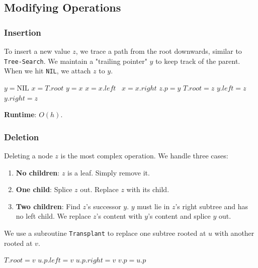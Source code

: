 \documentclass[12pt]{article}
\theoremstyle{blueplain}
\theoremstyle{bluedef}
\theoremstyle{blueremark}
\begin{document}
\subsection{Modifying Operations}

\subsubsection{Insertion}
To insert a new value $z$, we trace a path from the root downwards, similar to \texttt{Tree-Search}. We maintain a "trailing pointer" $y$ to keep track of the parent. When we hit \texttt{NIL}, we attach $z$ to $y$.

\begin{algorithm}
    \caption{Tree Insert}\label{alg:treeInsert}
    \begin{algorithmic}[1]
        \State $y = \text{NIL}$
        \State $x = T.root$
        \State $y = x$
         $x = x.left$
        \Else \ $x = x.right$
        \EndIf
        \EndWhile
        \State $z.p = y$
         $T.root = z$ 
         $y.left = z$
        \Else \ $y.right = z$
        \EndIf
        \EndProcedure
    \end{algorithmic}
\end{algorithm}
\textbf{Runtime}: $O(h)$.

\subsubsection{Deletion}
Deleting a node $z$ is the most complex operation. We handle three cases:
\begin{enumerate}
    \item \textbf{No children}: $z$ is a leaf. Simply remove it.
    \item \textbf{One child}: Splice $z$ out. Replace $z$ with its child.
    \item \textbf{Two children}: Find $z$'s successor $y$. $y$ must lie in $z$'s right subtree and has no left child. We replace $z$'s content with $y$'s content and splice $y$ out.
\end{enumerate}

We use a subroutine \texttt{Transplant} to replace one subtree rooted at $u$ with another rooted at $v$.

\begin{algorithm}
    \caption{Transplant}\label{alg:transplant}
    \begin{algorithmic}[1]
        \State $T.root = v$
        \State $u.p.left = v$
        \Else
        \State $u.p.right = v$
        \EndIf
        \State $v.p = u.p$
        \EndIf
        \EndProcedure
    \end{algorithmic}
\end{algorithm}
\end{document}
